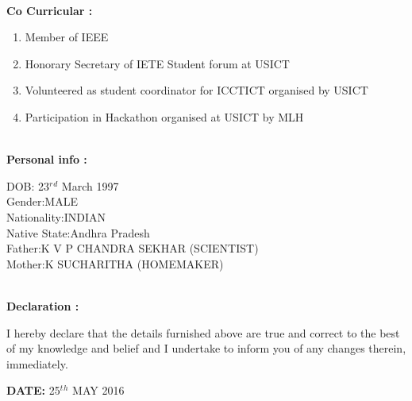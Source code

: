 \documentclass{article}
\begin{document}
\leavevmode\\
	\textbf{Co Curricular :}
	\begin{enumerate}
		\item Member of IEEE
		\item Honorary Secretary of IETE Student forum at USICT
		\item Volunteered as student coordinator for ICCTICT organised by USICT
		\item Participation in Hackathon organised at USICT by MLH
		
		\end{enumerate}
\leavevmode
\\
\textbf{Personal info :}
		\begin{flushleft}
		
			DOB: \hfill23$^r$$^d$ March 1997\\
			Gender:\hfill MALE\\
			Nationality:\hfill INDIAN\\
			Native State:\hfill Andhra Pradesh\\
		    Father:\hfill K V P  CHANDRA SEKHAR (SCIENTIST)\\
	     	Mother:\hfill K SUCHARITHA   (HOMEMAKER)\\
		
		\end{flushleft}
\leavevmode
\\
\leavevmode
\textbf{Declaration :}
	\begin{flushleft}
		I hereby declare that the details furnished above are true and correct to the best of my knowledge
		and belief and I undertake to inform you of any changes therein, immediately.
	\end{flushleft}	 

\begin{flushright}
	\textbf{DATE:} 25$^t$$^h$ MAY 2016
\end{flushright}
\end{document}
